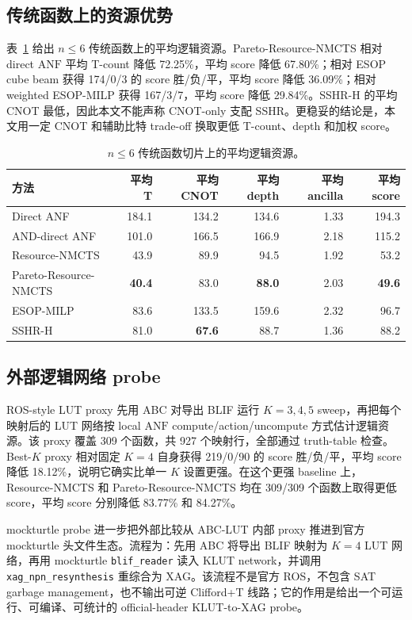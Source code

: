\documentclass[UTF8,fontset=macnew,11pt]{ctexart}
\newcommand{\method}{Resource-NMCTS}
\newcommand{\anf}{\ensuremath{\mathrm{ANF}}}
\newcommand{\ttable}{truth-table}
\begin{document}
\subsection{传统函数上的资源优势}

表~\ref{tab:traditional} 给出 $n\leq6$ 传统函数上的平均逻辑资源。Pareto-\method{} 相对 direct \anf{} 平均 T-count 降低 72.25\%，平均 score 降低 67.80\%；相对 ESOP cube beam 获得 174/0/3 的 score 胜/负/平，平均 score 降低 36.09\%；相对 weighted ESOP-MILP 获得 167/3/7，平均 score 降低 29.84\%。SSHR-H 的平均 CNOT 最低，因此本文不能声称 CNOT-only 支配 SSHR。更稳妥的结论是，本文用一定 CNOT 和辅助比特 trade-off 换取更低 T-count、depth 和加权 score。

\begin{table}[H]
\centering
\small
\caption{$n\leq6$ 传统函数切片上的平均逻辑资源。}
\label{tab:traditional}
\begin{tabular}{lrrrrr}
\toprule
方法 & 平均 T & 平均 CNOT & 平均 depth & 平均 ancilla & 平均 score \\
\midrule
Direct ANF & 184.1 & 134.2 & 134.6 & 1.33 & 194.3 \\
AND-direct ANF & 101.0 & 166.5 & 166.9 & 2.18 & 115.2 \\
\method{} & 43.9 & 89.9 & 94.5 & 1.92 & 53.2 \\
Pareto-\method{} & \textbf{40.4} & 83.0 & \textbf{88.0} & 2.03 & \textbf{49.6} \\
ESOP-MILP & 83.6 & 133.5 & 159.6 & 2.32 & 96.7 \\
SSHR-H & 81.0 & \textbf{67.6} & 88.7 & 1.36 & 88.2 \\
\bottomrule
\end{tabular}
\end{table}

\subsection{外部逻辑网络 probe}

ROS-style LUT proxy 先用 ABC 对导出 BLIF 运行 $K=3,4,5$ sweep，再把每个映射后的 LUT 网络按 local \anf{} compute/action/uncompute 方式估计逻辑资源。该 proxy 覆盖 309 个函数，共 927 个映射行，全部通过 \ttable{} 检查。Best-$K$ proxy 相对固定 $K=4$ 自身获得 219/0/90 的 score 胜/负/平，平均 score 降低 18.12\%，说明它确实比单一 $K$ 设置更强。在这个更强 baseline 上，\method{} 和 Pareto-\method{} 均在 309/309 个函数上取得更低 score，平均 score 分别降低 83.77\% 和 84.27\%。

mockturtle probe 进一步把外部比较从 ABC-LUT 内部 proxy 推进到官方 mockturtle 头文件生态。流程为：先用 ABC 将导出 BLIF 映射为 $K=4$ LUT 网络，再用 mockturtle \texttt{blif\_reader} 读入 KLUT network，并调用 \texttt{xag\_npn\_resynthesis} 重综合为 XAG。该流程不是官方 ROS，不包含 SAT garbage management，也不输出可逆 Clifford+T 线路；它的作用是给出一个可运行、可编译、可统计的 official-header KLUT-to-XAG probe。
\end{document}
